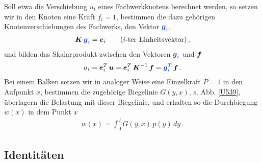 {{{Soll etwa die Verschiebung $u_i$ eines Fachwerkknotens berechnet werden, so
setzen wir in den Knoten eine Kraft $f_i = 1$,  bestimmen die dazu geh\"{o}rigen Knotenverschiebungen des Fachwerks, den Vektor $\textcolor{chapterTitleBlue}{\vek g_i}$,
\begin{align}
\vek K\,\textcolor{chapterTitleBlue}{\vek g_i} = \vek  e_i \qquad \text{($i$-ter Einheitsvektor)}\,,
\end{align}
und bilden das Skalarprodukt zwischen den Vektoren $\textcolor{chapterTitleBlue}{\vek g_i}$ und $\mbox{\boldmath $f$}$
\begin{align}
u_i = \vek e_i^T\,\vek u = \vek e_i^T\,\vek  K^{-1}\,\vek f = \textcolor{chapterTitleBlue}{\vek g_i^T}\,\vek f  \,.
\end{align}
Bei einem Balken setzen wir in analoger Weise eine Einzelkraft $P = 1$ in den Aufpunkt $x$, bestimmen die zugeh\"{o}rige Biegelinie $G(y,x)$, s. Abb. \ref{U539}, \"{u}berlagern die Belastung mit dieser Biegelinie, und erhalten so die Durchbiegung $w(x)$ in dem Punkt $x$
\begin{align}
w(x) = \int_0^{\,l} G(y,x)\,p(y)\,dy\,.
\end{align}
{\textcolor{sectionTitleBlue}{\subsection{Identit\"{a}ten}}}

}}}
